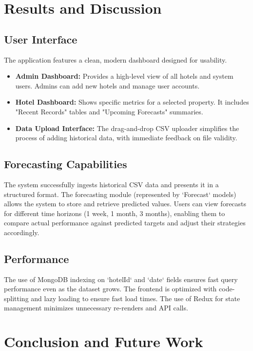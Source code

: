 \documentclass[letterpaper,11pt]{report}
\begin{document}
\chapter{Results and Discussion}

\section{User Interface}
The application features a clean, modern dashboard designed for usability.
\begin{itemize}
    \item \textbf{Admin Dashboard:} Provides a high-level view of all hotels and system users. Admins can add new hotels and manage user accounts.
    \item \textbf{Hotel Dashboard:} Shows specific metrics for a selected property. It includes "Recent Records" tables and "Upcoming Forecasts" summaries.
    \item \textbf{Data Upload Interface:} The drag-and-drop CSV uploader simplifies the process of adding historical data, with immediate feedback on file validity.
\end{itemize}

\section{Forecasting Capabilities}
The system successfully ingests historical CSV data and presents it in a structured format. The forecasting module (represented by `Forecast` models) allows the system to store and retrieve predicted values. Users can view forecasts for different time horizons (1 week, 1 month, 3 months), enabling them to compare actual performance against predicted targets and adjust their strategies accordingly.

\section{Performance}
The use of MongoDB indexing on `hotelId` and `date` fields ensures fast query performance even as the dataset grows. The frontend is optimized with code-splitting and lazy loading to ensure fast load times. The use of Redux for state management minimizes unnecessary re-renders and API calls.

\chapter{Conclusion and Future Work}
\end{document}
